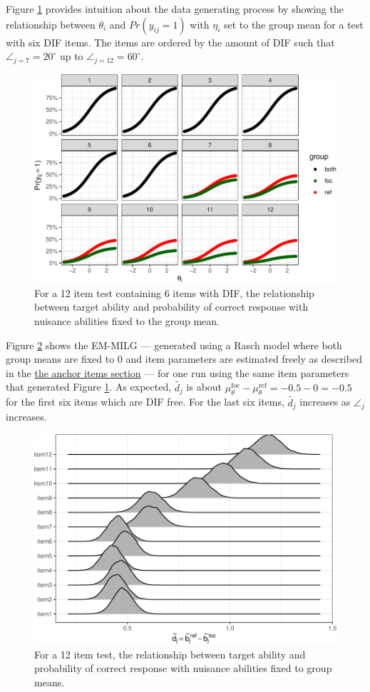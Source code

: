 \documentclass[
  11pt,
]{article}
\begin{document}
Figure \ref{fig:difmap} provides intuition about the data generating process by showing the relationship between \(\theta_i\) and \(Pr(y_{ij} = 1)\) with \(\eta_i\) set to the group mean for a test with six DIF items. The items are ordered by the amount of DIF such that \(\angle_{j = 7} = 20^\circ\) up to \(\angle_{j = 12} = 60^\circ\).

\begin{figure}[H]

{\centering \includegraphics[width=0.7\linewidth]{paper_files/figure-latex/difmap-1} 

}

\caption{For a 12 item test containing 6 items with DIF, the relationship between target ability and probability of correct response with nuisance abilities fixed to the group mean.}\label{fig:difmap}
\end{figure}

Figure \ref{fig:simemmlg} shows the EM-MILG --- generated using a Rasch model where both group means are fixed to 0 and item parameters are estimated freely as described in the \protect\hyperlink{anchoritems}{the anchor items section} --- for one run using the same item parameters that generated Figure \ref{fig:difmap}. As expected, \(\tilde{d_j}\) is about \(\mu_\theta^\text{foc} - \mu_\theta^\text{ref} = -0.5 - 0 = -0.5\) for the first six items which are DIF free. For the last six items, \(\tilde{d_j}\) increases as \(\angle_j\) increases.

\begin{figure}[H]

{\centering \includegraphics[width=0.7\linewidth]{paper_files/figure-latex/simemmlg-1} 

}

\caption{For a 12 item test, the relationship between target ability and probability of correct response with nuisance abilities fixed to group means.}\label{fig:simemmlg}
\end{figure}
\end{document}
